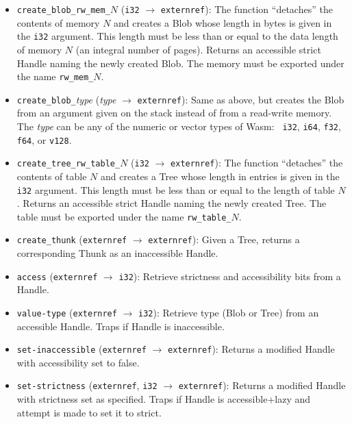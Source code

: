 \documentclass{article}
\newcommand{\blob}{\textrm{Blob}\xspace}
\newcommand{\thunk}{\textrm{Thunk}\xspace}
\newcommand{\tree}{\textrm{Tree}\xspace}
\newcommand{\handle}{\textrm{Handle}\xspace}
\begin{document}
\begin{itemize}
\item \texttt{create\_blob\_rw\_mem\_}$N$ (\texttt{i32} $\rightarrow$
  \texttt{externref}): The function ``detaches'' the contents of
  memory $N$ and creates a \blob whose length in bytes is given in
  the \texttt{i32} argument. This length must be less than or equal to
  the data length of memory $N$ (an integral number of pages). Returns
  an accessible strict \handle naming the newly created \blob. The
  memory must be exported under the name \texttt{rw\_mem\_}$N$.

\item \texttt{create\_blob\_}\emph{type} (\emph{type} $\rightarrow$
  \texttt{externref}): Same as above, but creates the \blob from an
  argument given on the stack instead of from a read-write memory. The
  \emph{type} can be any of the numeric or vector types of Wasm: {\tt
    i32}, {\tt i64}, {\tt f32}, {\tt f64}, or {\tt v128}.

\item \texttt{create\_tree\_rw\_table\_}$N$ (\texttt{i32}
  $\rightarrow$ \texttt{externref}): The function ``detaches'' the
  contents of table $N$ and creates a \tree whose length in entries is
  given in the \texttt{i32} argument. This length must be less than or
  equal to the length of table $N$. Returns an accessible strict \handle
  naming the newly created \tree. The table must be exported under the
  name \texttt{rw\_table\_}$N$.

\item \texttt{create\_thunk} (\texttt{externref} $\rightarrow$
  \texttt{externref}): Given a \tree, returns a corresponding \thunk as an inaccessible \handle.

\item \texttt{access} (\texttt{externref} $\rightarrow$ \texttt{i32}): Retrieve strictness and accessibility bits from a \handle.

\item \texttt{value-type} (\texttt{externref} $\rightarrow$ \texttt{i32}): Retrieve type (\blob or \tree) from an accessible \handle. Traps if \handle is inaccessible.

\item \texttt{set-inaccessible} (\texttt{externref} $\rightarrow$ \texttt{externref}): Returns a modified \handle with accessibility set to false.
  
\item \texttt{set-strictness} (\texttt{externref}, \texttt{i32} $\rightarrow$ \texttt{externref}): Returns a modified \handle with strictness set as specified. Traps if \handle is accessible+lazy and attempt is made to set
  it to strict.


\end{itemize}
\end{document}

